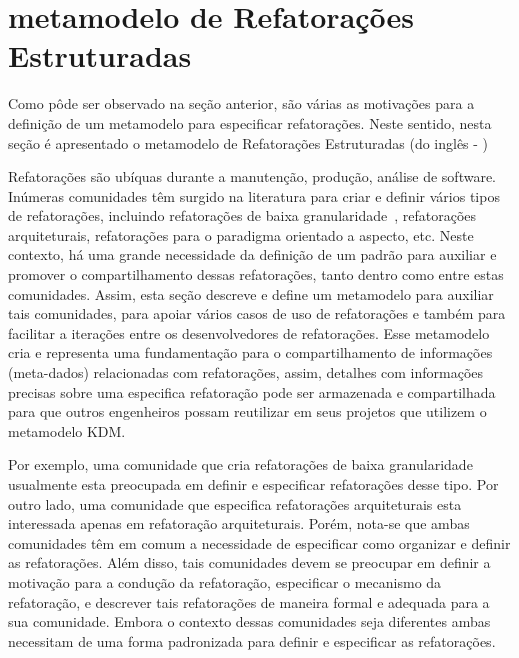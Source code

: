 
\section{metamodelo de Refatorações Estruturadas} %
\label{sec:meta_modelo_de_refatora_es_estruturadas_srm_do_ingl_s_structured refactoring meta-model_}

Como pôde ser observado na seção anterior, são várias as motivações para a definição de um metamodelo para especificar refatorações. Neste sentido, nesta seção é apresentado o metamodelo de Refatorações Estruturadas (do inglês - )

Refatorações são ubíquas durante a manutenção, produção, análise de software. Inúmeras comunidades têm surgido na literatura para criar e definir vários tipos de refatorações, incluindo refatorações de baixa granularidade~\cite{Fowler1999, Demeyer1, Demeyer2}, refatorações arquiteturais, refatorações para o paradigma orientado a aspecto, etc. Neste contexto, há uma grande necessidade da definição de um padrão para auxiliar e promover o compartilhamento dessas refatorações, tanto dentro como entre estas comunidades. Assim, esta seção descreve e define um metamodelo para auxiliar tais comunidades, para apoiar vários casos de uso de refatorações e também para facilitar a iterações entre os desenvolvedores de refatorações. Esse metamodelo cria e representa uma fundamentação para o compartilhamento de informações (meta-dados) relacionadas com refatorações, assim, detalhes com informações precisas sobre uma especifica refatoração pode ser armazenada e compartilhada para que outros engenheiros possam reutilizar em seus projetos que utilizem o metamodelo KDM.

Por exemplo, uma comunidade que cria refatorações de baixa granularidade usualmente esta preocupada em definir e especificar refatorações desse tipo. Por outro lado, uma comunidade que especifica refatorações arquiteturais esta interessada apenas em refatoração arquiteturais. Porém, nota-se que ambas comunidades têm em comum a necessidade de especificar como organizar e definir as refatorações. Além disso, tais comunidades devem se preocupar em definir a motivação para a condução da refatoração, especificar o mecanismo da refatoração, e descrever tais refatorações de maneira formal e adequada para a sua comunidade. Embora o contexto dessas comunidades seja diferentes ambas necessitam de uma forma padronizada para definir e especificar as refatorações. 

